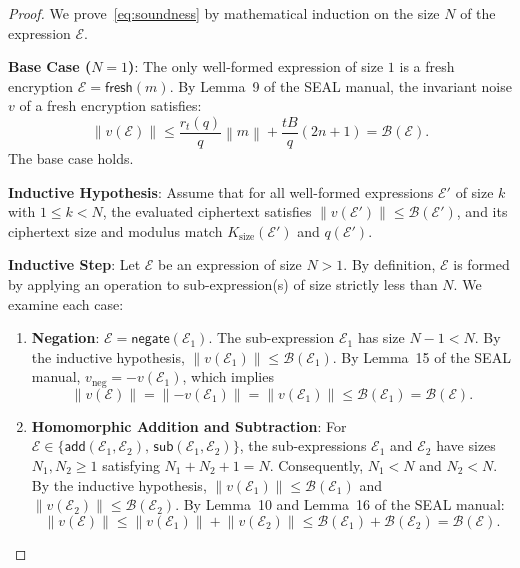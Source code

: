 \documentclass[11pt]{article}
\theoremstyle{definition}
\theoremstyle{remark}
\newcommand{\norm}[1]{\left\lVert #1\right\rVert}
\newcommand{\vneg}{v_{\mathrm{neg}}}
\begin{document}
\begin{proof}
We prove~\eqref{eq:soundness} by mathematical induction on the size $N$ of the expression $\mathcal{E}$.

\textbf{Base Case ($N=1$)}:
The only well-formed expression of size $1$ is a fresh encryption $\mathcal{E} = \mathsf{fresh}(m)$.
By Lemma~9 of the SEAL manual, the invariant noise $v$ of a fresh encryption satisfies:
\[
  \norm{v(\mathcal{E})} \leq \frac{r_t(q)}{q}\norm{m} + \frac{tB}{q}(2n+1) = \mathcal{B}(\mathcal{E}).
\]
The base case holds.

\textbf{Inductive Hypothesis}:
Assume that for all well-formed expressions $\mathcal{E}'$ of size $k$ with $1 \leq k < N$, the evaluated ciphertext satisfies $\norm{v(\mathcal{E}')} \leq \mathcal{B}(\mathcal{E}')$, and its ciphertext size and modulus match $K_{\mathrm{size}}(\mathcal{E}')$ and $q(\mathcal{E}')$.

\textbf{Inductive Step}:
Let $\mathcal{E}$ be an expression of size $N > 1$. By definition, $\mathcal{E}$ is formed by applying an operation to sub-expression(s) of size strictly less than $N$. We examine each case:

\begin{enumerate}[leftmargin=2em]
\item \textbf{Negation}: $\mathcal{E} = \mathsf{negate}(\mathcal{E}_1)$. The sub-expression $\mathcal{E}_1$ has size $N-1 < N$.
      By the inductive hypothesis, $\norm{v(\mathcal{E}_1)} \leq \mathcal{B}(\mathcal{E}_1)$.
      By Lemma~15 of the SEAL manual, $\vneg = -v(\mathcal{E}_1)$, which implies
      \[
        \norm{v(\mathcal{E})} = \norm{-v(\mathcal{E}_1)} = \norm{v(\mathcal{E}_1)} \leq \mathcal{B}(\mathcal{E}_1) = \mathcal{B}(\mathcal{E}).
      \]

\item \textbf{Homomorphic Addition and Subtraction}: For $\mathcal{E} \in \{\mathsf{add}(\mathcal{E}_1, \mathcal{E}_2),\, \mathsf{sub}(\mathcal{E}_1, \mathcal{E}_2)\}$,
      the sub-expressions $\mathcal{E}_1$ and $\mathcal{E}_2$ have sizes $N_1, N_2 \geq 1$ satisfying $N_1 + N_2 + 1 = N$.
      Consequently, $N_1 < N$ and $N_2 < N$.
      By the inductive hypothesis, $\norm{v(\mathcal{E}_1)} \leq \mathcal{B}(\mathcal{E}_1)$ and $\norm{v(\mathcal{E}_2)} \leq \mathcal{B}(\mathcal{E}_2)$.
      By Lemma~10 and Lemma~16 of the SEAL manual:
      \[
        \norm{v(\mathcal{E})} \leq \norm{v(\mathcal{E}_1)} + \norm{v(\mathcal{E}_2)} \leq \mathcal{B}(\mathcal{E}_1) + \mathcal{B}(\mathcal{E}_2) = \mathcal{B}(\mathcal{E}).
      \]


\end{enumerate}
\end{proof}
\end{document}
